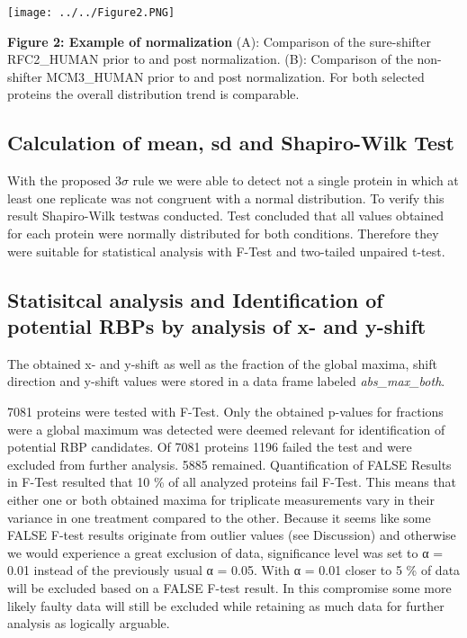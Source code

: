 \documentclass[
]{article}
\begin{document}
\texttt{[image: ../../Figure2.PNG]}

\textbf{Figure 2: Example of normalization} (A): Comparison of the
sure-shifter RFC2\_HUMAN prior to and post normalization. (B):
Comparison of the non-shifter MCM3\_HUMAN prior to and post
normalization. For both selected proteins the overall distribution trend
is comparable.

\hypertarget{calculation-of-mean-sd-and-shapiro-wilk-test}{%
\subsection{Calculation of mean, sd and Shapiro-Wilk
Test}\label{calculation-of-mean-sd-and-shapiro-wilk-test}}

With the proposed 3\(\sigma\) rule we were able to detect not a single
protein in which at least one replicate was not congruent with a normal
distribution. To verify this result Shapiro-Wilk testwas conducted. Test
concluded that all values obtained for each protein were normally
distributed for both conditions. Therefore they were suitable for
statistical analysis with F-Test and two-tailed unpaired t-test.

\hypertarget{statisitcal-analysis-and-identification-of-potential-rbps-by-analysis-of-x--and-y-shift}{%
\subsection{Statisitcal analysis and Identification of potential RBPs by
analysis of x- and
y-shift}\label{statisitcal-analysis-and-identification-of-potential-rbps-by-analysis-of-x--and-y-shift}}

The obtained x- and y-shift as well as the fraction of the global
maxima, shift direction and y-shift values were stored in a data frame
labeled \emph{abs\_max\_both}.

7081 proteins were tested with F-Test. Only the obtained p-values for
fractions were a global maximum was detected were deemed relevant for
identification of potential RBP candidates. Of 7081 proteins 1196 failed
the test and were excluded from further analysis. 5885 remained.
Quantification of FALSE Results in F-Test resulted that 10 \% of all
analyzed proteins fail F-Test. This means that either one or both
obtained maxima for triplicate measurements vary in their variance in
one treatment compared to the other. Because it seems like some FALSE
F-test results originate from outlier values (see Discussion) and
otherwise we would experience a great exclusion of data, significance
level was set to α = 0.01 instead of the previously usual α = 0.05. With
α = 0.01 closer to 5 \% of data will be excluded based on a FALSE F-test
result. In this compromise some more likely faulty data will still be
excluded while retaining as much data for further analysis as logically
arguable.
\end{document}
